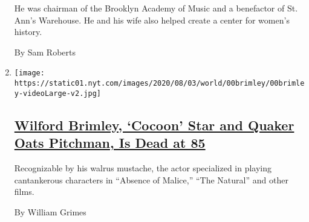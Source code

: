 \begin{enumerate}
  He was chairman of the Brooklyn Academy of Music and a benefactor of
  St. Ann's Warehouse. He and his wife also helped create a center for
  women's history.

  By Sam Roberts
\item
  \texttt{[image: https://static01.nyt.com/images/2020/08/03/world/00brimley/00brimley-videoLarge-v2.jpg]}

  \hypertarget{wilford-brimley-cocoon-star-and-quaker-oats-pitchman-is-dead-at-85}{%
  \subsection{\texorpdfstring{\href{/2020/08/01/obituaries/wilford-brimley-dead.html}{Wilford
  Brimley, `Cocoon' Star and Quaker Oats Pitchman, Is Dead at
  85}}{Wilford Brimley, `Cocoon' Star and Quaker Oats Pitchman, Is Dead at 85}}\label{wilford-brimley-cocoon-star-and-quaker-oats-pitchman-is-dead-at-85}}

  Recognizable by his walrus mustache, the actor specialized in playing
  cantankerous characters in ``Absence of Malice,'' ``The Natural'' and
  other films.

  By William Grimes
\end{enumerate}

